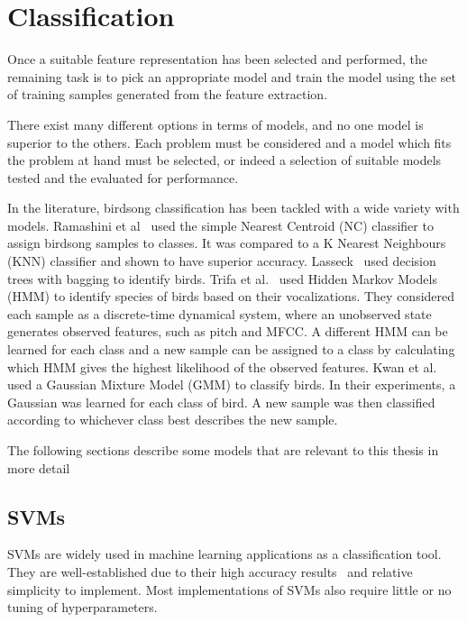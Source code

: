 \section{Classification}\label{sec:classification}

Once a suitable feature representation has been selected and performed, the
remaining task is to pick an appropriate model and train the model using the set
of training samples generated from the feature extraction.

There exist many different options in terms of models, and no one model is
superior to the others. Each problem must be considered and a model which fits
the problem at hand must be selected, or indeed a selection of suitable models
tested and the evaluated for performance.

In the literature, birdsong classification has been tackled with a wide variety
with models. Ramashini et al~\cite{ramashini2019bird} used the simple Nearest
Centroid (NC) classifier to assign birdsong samples to classes. It was compared
to a K Nearest Neighbours (KNN) classifier and shown to have superior accuracy.
Lasseck~\cite{lasseck2015improved} used decision trees with bagging to identify
birds. Trifa et al.~\cite{trifa2008automated} used Hidden Markov Models (HMM) to
identify species of birds based on their vocalizations. They considered each
sample as a discrete-time dynamical system, where an unobserved state generates
observed features, such as pitch and MFCC\@. A different HMM can be learned for
each class and a new sample can be assigned to a class by calculating which HMM
gives the highest likelihood of the observed features. Kwan et
al.~\cite{kwan2006automated} used a Gaussian Mixture Model (GMM) to classify
birds. In their experiments, a Gaussian was learned for each class of bird. A
new sample was then classified according to whichever class best describes the
new sample.

The following sections describe some models that are relevant to this thesis in
more detail

\subsection{SVMs}

SVMs are widely used in machine learning applications as a classification tool.
They are well-established due to their high accuracy
results~\cite{fagerlund2007bird} and relative simplicity to implement. Most
implementations of SVMs also require little or no tuning of hyperparameters.

